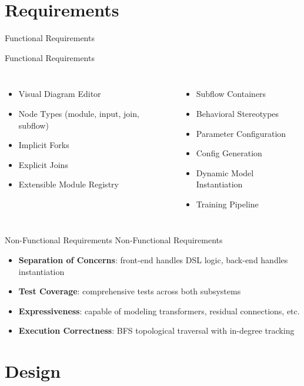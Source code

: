 \documentclass[11pt]{beamer}
\begin{document}
\section{Requirements}


\begin{frame}{Functional Requirements}

	\alert{Functional Requirements}
	\begin{columns}[t]
		\begin{itemize}
			\item Visual Diagram Editor
			\item Node Types (module, input, join, subflow)
			\item Implicit Forks
			\item Explicit Joins
			\item Extensible Module Registry
		\end{itemize}
		\begin{itemize}
			\item Subflow Containers
			\item Behavioral Stereotypes
			\item Parameter Configuration
			\item Config Generation
			\item Dynamic Model Instantiation
			\item Training Pipeline
		\end{itemize}
	\end{columns}
\end{frame}



\begin{frame}{Non-Functional Requirements}
	\alert{Non-Functional Requirements}


	\begin{itemize}
		\item \textbf{Separation of Concerns}: front-end handles DSL logic, back-end handles instantiation
		\item \textbf{Test Coverage}: comprehensive tests across both subsystems
		\item \textbf{Expressiveness}: capable of modeling transformers, residual connections, etc.
		\item \textbf{Execution Correctness}: BFS topological traversal with in-degree tracking
	\end{itemize}
\end{frame}

\section{Design}
\end{document}
